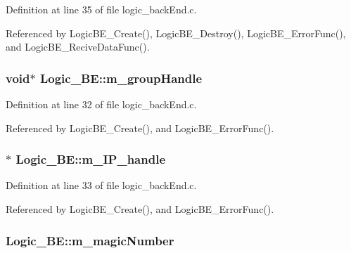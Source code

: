 Definition at line 35 of file logic\+\_\+back\+End.\+c.



Referenced by Logic\+B\+E\+\_\+\+Create(), Logic\+B\+E\+\_\+\+Destroy(), Logic\+B\+E\+\_\+\+Error\+Func(), and Logic\+B\+E\+\_\+\+Recive\+Data\+Func().

\subsubsection[{\texorpdfstring{m\+\_\+group\+Handle}{m_groupHandle}}]{\setlength{\rightskip}{0pt plus 5cm}void$\ast$ Logic\+\_\+\+B\+E\+::m\+\_\+group\+Handle}\hypertarget{structLogic__BE_a7f066039d469af42992f7b84cd157867}{}\label{structLogic__BE_a7f066039d469af42992f7b84cd157867}


Definition at line 32 of file logic\+\_\+back\+End.\+c.



Referenced by Logic\+B\+E\+\_\+\+Create(), and Logic\+B\+E\+\_\+\+Error\+Func().

\subsubsection[{\texorpdfstring{m\+\_\+\+I\+P\+\_\+handle}{m_IP_handle}}]{$\ast$ Logic\+\_\+\+B\+E\+::m\+\_\+\+I\+P\+\_\+handle}\hypertarget{structLogic__BE_ad411dc90a15355dd051a0b18f3e65f10}{}\label{structLogic__BE_ad411dc90a15355dd051a0b18f3e65f10}


Definition at line 33 of file logic\+\_\+back\+End.\+c.



Referenced by Logic\+B\+E\+\_\+\+Create(), and Logic\+B\+E\+\_\+\+Error\+Func().

\subsubsection[{\texorpdfstring{m\+\_\+magic\+Number}{m_magicNumber}}]{ Logic\+\_\+\+B\+E\+::m\+\_\+magic\+Number}\hypertarget{structLogic__BE_ae61735c21ef968851a2eacb8511188fa}{}\label{structLogic__BE_ae61735c21ef968851a2eacb8511188fa}


